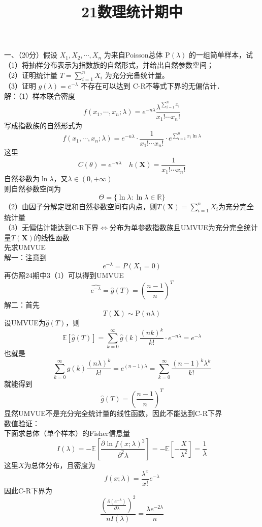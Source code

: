 \documentclass[UTF8]{ctexart}
\title{21数理统计期中}
\author{\textcalligra{NULIOUS}}
\date{}
\begin{document}
\maketitle
\noindent 一、（20分）假设 $X_1, X_2, \cdots, X_n$ 为来自Poisson总体 $\mathrm{P}(\lambda)$ 的一组简单样本，试\\
（1）将抽样分布表示为指数族的自然形式，并给出自然参数空间；\\
（2）证明统计量 $T=\sum_{i=1}^n X_i$ 为充分完备统计量。\\
（3）证明 $g(\lambda)=e^{-\lambda}$ 不存在可以达到 C-R不等式下界的无偏估计．\\
解：（1）样本联合密度
\[
f\left(x_1, \cdots, x_n ; \lambda\right)=e^{-n \lambda} \frac{\lambda^{\sum\limits_{i=1}^n x_i}}{x_{1}!\cdots x_{n}!}
\]
写成指数族的自然形式为
\[
f\left(x_1, \cdots, x_n ; \lambda\right)=e^{-n \lambda} \cdot \frac{1}{x_{1}!\cdots x_{n}!} \cdot e^{\sum\limits_{i=1}^{n} x_i \ln \lambda}
\]
这里
\[
C(\theta)=e^{-n \lambda}\quad h(\boldsymbol{X})=\frac{1}{x_{1}!\cdots x_{n}!}
\]
自然参数为$\ln \lambda$，又$\lambda \in (0,+\infty)$\\
则自然参数空间为
\[
\Theta=\{\ln \lambda:\ln \lambda \in \mathbb{R}\}
\]
（2）由因子分解定理和自然参数空间有内点，则$T(\boldsymbol{X})=\sum\limits_{i=1}^n X_i$为充分完全统计量\\
（3）无偏估计能达到C-R下界$\iff$分布为单参数指数族且UMVUE为充分完全统计量$T(\boldsymbol{X})$的线性函数\\
先求UMVUE\\
解一：注意到
\[
e^{-\lambda}=P(X_1=0)
\]
再仿照24期中3（1）可以得到UMVUE
\[
\hat{e^{-\lambda}}=\hat{g}(T)=\left(\frac{n-1}{n} \right)^T 
\]
解二：首先
\[
T(\boldsymbol{X})\sim \mathrm{P}(n\lambda)
\]
设UMVUE为$\hat{g}(T)$，则
\[
\mathbb{E}\left[\hat{g}(T) \right] =\sum_{k=0}^{\infty} \hat{g}(k)\frac{(nk)^k}{k!}\cdot e^{-n\lambda}=e^{-\lambda}
\]
也就是
\[
\sum_{k=0}^{\infty} \hat{g}(k) \frac{(n\lambda)^k}{k!}=e^{(n-1) \lambda}=\sum_{k=0}^{\infty} \frac{(n-1)^k \lambda^k}{k!}
\]
就能得到
\[
\hat{g}(T)=\left(\frac{n-1}{n} \right)^T 
\]
显然UMVUE不是充分完全统计量的线性函数，因此不能达到C-R下界\\
数值验证：\\
下面求总体（单个样本）的Fisher信息量
\[
I(\lambda)=-\mathbb{E}\left[\frac{\partial \ln f(x ; \lambda)^2}{\partial^2 \lambda}\right]=-\mathbb{E}\left[-\frac{X}{\lambda^2} \right] =\frac{1}{\lambda}
\]
这里$X$为总体分布，且密度为
\[
f(x ; \lambda)=\frac{\lambda^x}{x!}e^{-\lambda}
\]
因此C-R下界为
\[
\frac{\left( \frac{\partial\left(e^{-\lambda}\right)}{\partial \lambda}\right)^2}{n I(\lambda)}=\frac{\lambda e^{-2 \lambda}}{n} 
\]
\end{document}
